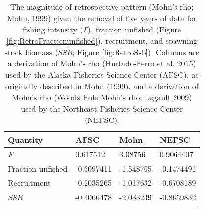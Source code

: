 
\begin{longtable}[t]{llll}
\caption{\label{tab:RetroMohnsrho}The magnitude of retrospective pattern (Mohn's rho; Mohn, 1999) given the removal of five years of data for fishing intensity (\emph{F}), fraction unfished (Figure \ref{fig:RetroFractionunfished}),  recruitment, and spawning stock biomass (\emph{SSB}; Figure \ref{fig:RetroSsb}). Columns are a derivation of Mohn's rho (Hurtado-Ferro et al. 2015) used by the Alaska Fisheries Science Center (AFSC), as originally described in Mohn (1999), and a derivation of Mohn's rho (Woods Hole Mohn's rho; Legault 2009) used by the Northeast Fisheries Science Center (NEFSC).}\\
\toprule
Quantity & AFSC & Mohn & NEFSC\\
\midrule
\emph{F} & 0.617512 & 3.08756 & 0.9064407\\
Fraction unfished & -0.3097411 & -1.548705 & -0.1474491\\
Recruitment & -0.2035265 & -1.017632 & -0.6708189\\
\emph{SSB} & -0.4066478 & -2.033239 & -0.8659832\\
\bottomrule
\end{longtable}
